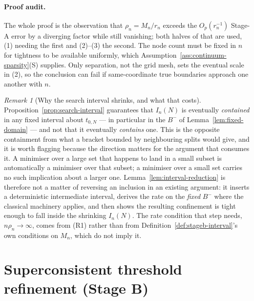 \documentclass[11pt]{article}
\theoremstyle{plain}
\theoremstyle{definition}
\theoremstyle{remark}
\newtheorem{remark}[theorem]{Remark}
\begin{document}
\paragraph{Proof audit.}
The whole proof is the observation that \(\rho_n=M_n/r_n\) exceeds the
\(O_p(r_n^{-1})\) Stage-A error by a diverging factor while still vanishing;
both halves of that are used, (1) needing the first and (2)--(3) the second.
The node count must be fixed in \(n\) for tightness to be available
uniformly, which Assumption~\ref{ass:continuum-sparsity}(S) supplies. Only
separation, not the grid mesh, sets the eventual scale in (2), so the
conclusion can fail if same-coordinate true boundaries approach one another
with \(n\).

\begin{remark}[Why the search interval shrinks, and what that costs]
\label{rem:interval-vs-bracket}
Proposition~\ref{prop:search-interval} guarantees that \(I_n(N)\) is
eventually \emph{contained} in any fixed interval about \(t_{0,N}\) --- in
particular in the \(B^-\) of Lemma~\ref{lem:fixed-domain} --- and not
that it eventually \emph{contains} one. This is the opposite containment from
what a bracket bounded by neighbouring splits would give, and it is worth
flagging because the direction matters for the argument that consumes it.
A minimiser over a large set that happens to land in a small subset is
automatically a minimiser over that subset; a minimiser over a small set
carries no such implication about a larger one. Lemma~\ref{lem:interval-reduction}
is therefore not a matter of reversing an inclusion in an existing argument:
it inserts a deterministic intermediate interval, derives the rate on the
\emph{fixed} \(B^-\) where the classical machinery applies, and then shows the
resulting confinement is tight enough to fall inside the shrinking
\(I_n(N)\). The rate condition that step needs, \(n\rho_n\to\infty\), comes
from (R1) rather than from Definition~\ref{def:stageb-interval}'s own
conditions on \(M_n\), which do not imply it.
\end{remark}



\section{Superconsistent threshold refinement (Stage B)}\label{sec:stageb}
\end{document}

